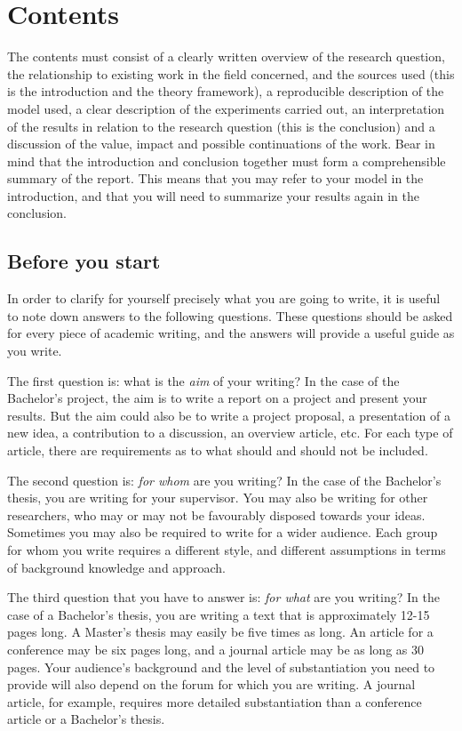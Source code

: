 \section{Contents}\label{sec:contents}
The contents must consist of a clearly written overview of the research question, the relationship to existing work in the field concerned, and the sources used (this is the introduction and the theory framework), a reproducible description of the model used, a clear description of the experiments carried out, an interpretation of the results in relation to the research question (this is the conclusion) and a discussion of the value, impact and possible continuations of the work. Bear in mind that the introduction and conclusion together must form a comprehensible summary of the report. This means that you may refer to your model in the introduction, and that you will need to summarize your results again in the conclusion.

\subsection{Before you start}\label{sec:_before_you_start}
In order to clarify for yourself precisely what you are going to write, it is useful to note down answers to the following questions. These questions should be asked for every piece of academic writing, and the answers will provide a useful guide as you write.

The first question is: what is the \textit{aim} of your writing? In the case of the Bachelor's project, the aim is to write a report on a project and present your results. But the aim could also be to write a project proposal, a presentation of a new idea, a contribution to a discussion, an overview article, etc. For each type of article, there are requirements as to what should and should not be included.

The second question is: \textit{for whom} are you writing? In the case of the Bachelor's thesis, you are writing for your supervisor. You may also be writing for other researchers, who may or may not be favourably disposed towards your ideas. Sometimes you may also be required to write for a wider audience. Each group for whom you write requires a different style, and different assumptions in terms of background knowledge and approach.

The third question that you have to answer is: \textit{for what} are you writing? In the case of a Bachelor's thesis, you are writing a text that is approximately 12-15 pages long. A Master's thesis may easily be five times as long. An article for a conference may be six pages long, and a journal article may be as long as 30 pages. Your audience's background and the level of substantiation you need to provide will also depend on the forum for which you are writing. A journal article, for example, requires more detailed substantiation than a conference article or a Bachelor's thesis.

